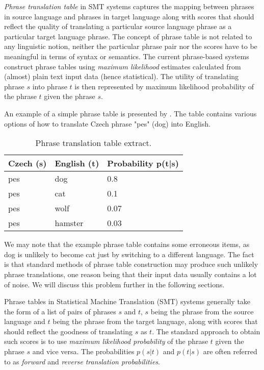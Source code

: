 \emph{Phrase translation table} in SMT systems captures the mapping
between phrases in source language and phrases in target language
along with scores that should reflect the quality of translating a particular
source language phrase as a particular target language phrase.
The concept of phrase table is not related to any linguistic notion,
neither the particular phrase pair nor the scores have to be meaningful
in terms of syntax or semantics. The current phrase-based systems construct
phrase tables using \emph{maximum likelihood} estimates calculated from (almost)
plain text input data (hence statistical). The utility of translating phrase
$s$ into phrase $t$ is then represented by maximum likelihood probability of
the phrase $t$ given the phrase $s$.

An example of a simple phrase table is presented by .
The table contains various options of how to translate Czech phrase
"pes" (dog) into English.

\begin{table}[h]
\centering
\begin{tabular}{ l l l}
Czech (s) & English (t) & Probability p(t|s) \\
\hline
\hline
pes & dog & 0.8 \\
pes & cat & 0.1 \\
pes & wolf & 0.07 \\
pes & hamster & 0.03 \\
\hline
\hline
\end{tabular}
\caption{\label{phrase-table-example}Phrase translation table extract.}
\end{table}

We may note that the example phrase table contains some erroneous items,
as dog is unlikely to become cat just by switching to a different language.
The fact is that standard methods of phrase table construction may produce such
unlikely phrase translations, one reason being that their input data usually
contains a lot of noise.
We will discuss this problem further in the following sections.


Phrase tables in Statistical Machine Translation (SMT) systems generally take
the form of a list of pairs of phrases $s$ and $t$, $s$ being the phrase from
the source language and $t$ being the phrase from the target language, along
with scores that should reflect the goodness of translating $s$ as $t$.
The standard approach to obtain such scores is to use \emph{maximum likelihood
probability} of the phrase $t$ given the phrase $s$ and vice versa.
The probabilities $p(s|t)$ and $p(t|s)$ are often referred to as
\emph{forward} and \emph{reverse} \emph{translation probabilities}.


